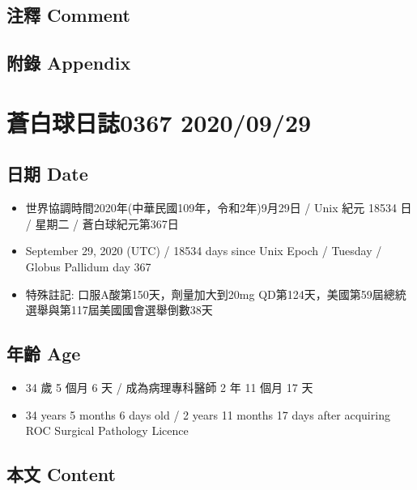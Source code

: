 \documentclass[a5paper, 11pt
]{book}
\providecommand{\tightlist}{%
  \setlength{\itemsep}{0pt}\setlength{\parskip}{0pt}}
\begin{document}
\hypertarget{ux6ce8ux91cb-comment-26}{%
\subsection{注釋 Comment}\label{ux6ce8ux91cb-comment-26}}

\hypertarget{ux9644ux9304-appendix-26}{%
\subsection{附錄 Appendix}\label{ux9644ux9304-appendix-26}}

\hypertarget{ux84bcux767dux7403ux65e5ux8a8c0367-20200929}{%
\section{蒼白球日誌0367
2020/09/29}\label{ux84bcux767dux7403ux65e5ux8a8c0367-20200929}}

\hypertarget{ux65e5ux671f-date-27}{%
\subsection{日期 Date}\label{ux65e5ux671f-date-27}}

\begin{itemize}
\tightlist
\item
  世界協調時間2020年(中華民國109年，令和2年)9月29日 / Unix 紀元 18534 日
  / 星期二 / 蒼白球紀元第367日
\item
  September 29, 2020 (UTC) / 18534 days since Unix Epoch / Tuesday /
  Globus Pallidum day 367
\item
  特殊註記: 口服A酸第150天，劑量加大到20mg
  QD第124天，美國第59屆總統選舉與第117屆美國國會選舉倒數38天
\end{itemize}

\hypertarget{ux5e74ux9f61-age-27}{%
\subsection{年齡 Age}\label{ux5e74ux9f61-age-27}}

\begin{itemize}
\tightlist
\item
  34 歲 5 個月 6 天 / 成為病理專科醫師 2 年 11 個月 17 天
\item
  34 years 5 months 6 days old / 2 years 11 months 17 days after
  acquiring ROC Surgical Pathology Licence
\end{itemize}

\hypertarget{ux672cux6587-content-27}{%
\subsection{本文 Content}\label{ux672cux6587-content-27}}
\end{document}
